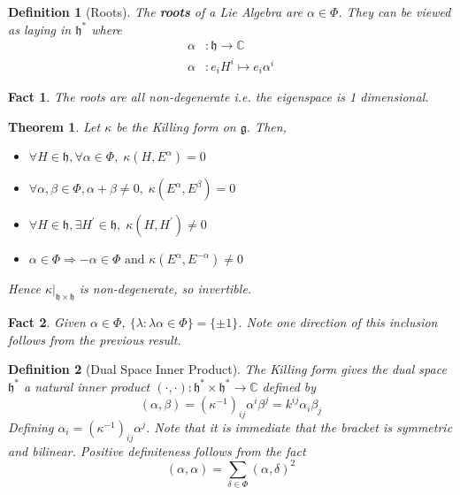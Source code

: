 \documentclass{article}
\newtheorem{theorem}{Theorem}[subsection]
\newtheorem{definition}{Definition}[subsection]
\newtheorem{fact}{Fact}[subsection]
\newcommand{\bam}[1]{\textbf{#1}}
\newcommand{\mf}[1]{\mathfrak{#1}}
\newcommand{\mbb}[1]{\mathbb{#1}}
\begin{document}
\begin{definition}[Roots]
The \bam{roots} of a Lie Algebra are $\alpha\in\Phi$. They can be viewed as laying in $\mf{h}^\ast$ where 
\begin{align*}
\alpha &:\mf{h}\to\mbb{C} \\
\alpha &: e_i H^i \mapsto e_i \alpha^i
\end{align*}
\end{definition}

\begin{fact}
The roots are all non-degenerate i.e. the eigenspace is 1 dimensional. 
\end{fact}

\begin{theorem}
Let $\kappa$ be the Killing form on $\mf{g}$. Then, 
\begin{itemize}
    \item $\forall H\in\mf{h}, \forall\alpha\in\Phi, \; \kappa\left(H,E^\alpha\right)=0 $
    \item $\forall\alpha,\beta\in\Phi, \alpha+\beta\neq0, \; \kappa\left(E^\alpha,E^\beta\right)=0$
    \item $\forall H\in\mf{h}, \exists H^\prime\in\mf{h}, \; \kappa\left(H,H^\prime\right)\neq0$
    \item $\alpha\in\Phi \Rightarrow -\alpha\in\Phi \text{ and } \kappa\left(E^\alpha,E^{-\alpha}\right)\neq0$
\end{itemize}
Hence $\kappa|_{\mf{h}\times\mf{h}}$ is non-degenerate, so invertible. 
\end{theorem}

\begin{fact}
Given $\alpha\in\Phi$, $\lbrace \lambda : \lambda\alpha\in\Phi \rbrace = \lbrace \pm1 \rbrace$. Note one direction of this inclusion follows from the previous result. 
\end{fact}

\begin{definition}[Dual Space Inner Product]
The Killing form gives the dual space $\mf{h}^\ast$ a natural inner product $(\cdot,\cdot):\mf{h}^\ast \times \mf{h}^\ast \to \mbb{C}$ defined by 
\[
(\alpha, \beta) = \left(\kappa^{-1}\right)_{ij} \alpha^i \beta^j = k^{ij} \alpha_i \beta_j
\]
Defining $\alpha_i=\left( \kappa^{-1} \right)_{ij} \alpha^j$. Note that it is immediate that the bracket is symmetric and bilinear. Positive definiteness follows from the fact
\[
(\alpha, \alpha)=\sum_{\delta\in\Phi} (\alpha, \delta)^2
\]
\end{definition}
\end{document}
